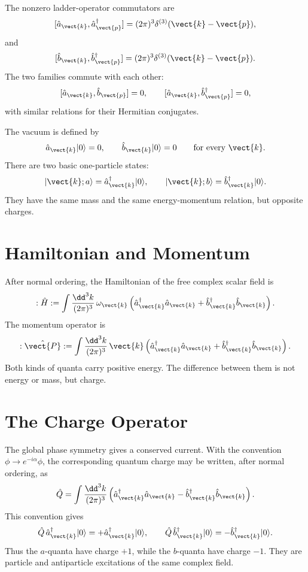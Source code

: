 The nonzero ladder-operator commutators are
\[
    [\hat a_{\vect{k}},\hat a_{\vect{p}}^\dagger]
    = (2\pi)^3\delta^{(3)}(\vect{k}-\vect{p}),
\]
and
\[
    [\hat b_{\vect{k}},\hat b_{\vect{p}}^\dagger]
    = (2\pi)^3\delta^{(3)}(\vect{k}-\vect{p}).
\]
The two families commute with each other:
\[
    [\hat a_{\vect{k}},\hat b_{\vect{p}}]=0,
    \qquad
    [\hat a_{\vect{k}},\hat b_{\vect{p}}^\dagger]=0,
\]
with similar relations for their Hermitian conjugates.

The vacuum is defined by
\[
    \hat a_{\vect{k}}|0\rangle=0,
    \qquad
    \hat b_{\vect{k}}|0\rangle=0
    \qquad \text{for every }\vect{k}.
\]
There are two basic one-particle states:
\[
    |\vect{k};a\rangle
    = \hat a_{\vect{k}}^\dagger|0\rangle,
    \qquad
    |\vect{k};b\rangle
    = \hat b_{\vect{k}}^\dagger|0\rangle.
\]
They have the same mass and the same energy-momentum relation, but opposite
charges.

\section{Hamiltonian and Momentum}

After normal ordering, the Hamiltonian of the free complex scalar field is
\[
    :\hat H:
    = \int\frac{\dd^3k}{(2\pi)^3}\,
      \omega_{\vect{k}}
      \left(
          \hat a_{\vect{k}}^\dagger\hat a_{\vect{k}}
          +
          \hat b_{\vect{k}}^\dagger\hat b_{\vect{k}}
      \right).
\]
The momentum operator is
\[
    :\hat{\vect{P}}:
    = \int\frac{\dd^3k}{(2\pi)^3}\,
      \vect{k}
      \left(
          \hat a_{\vect{k}}^\dagger\hat a_{\vect{k}}
          +
          \hat b_{\vect{k}}^\dagger\hat b_{\vect{k}}
      \right).
\]
Both kinds of quanta carry positive energy. The difference between them is not
energy or mass, but charge.

\section{The Charge Operator}

The global phase symmetry gives a conserved current. With the convention
\(\phi\to e^{-i\alpha}\phi\), the corresponding quantum charge may be written,
after normal ordering, as
\[
    \hat Q
    = \int\frac{\dd^3k}{(2\pi)^3}
      \left(
          \hat a_{\vect{k}}^\dagger\hat a_{\vect{k}}
          -
          \hat b_{\vect{k}}^\dagger\hat b_{\vect{k}}
      \right).
\]
This convention gives
\[
    \hat Q\,\hat a_{\vect{k}}^\dagger|0\rangle
    = +\hat a_{\vect{k}}^\dagger|0\rangle,
    \qquad
    \hat Q\,\hat b_{\vect{k}}^\dagger|0\rangle
    = -\hat b_{\vect{k}}^\dagger|0\rangle.
\]
Thus the \(a\)-quanta have charge \(+1\), while the \(b\)-quanta have charge
\(-1\). They are particle and antiparticle excitations of the same complex
field.

